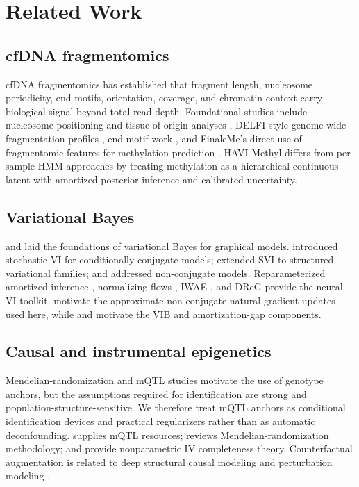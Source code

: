 \section{Related Work}
\label{sec:related}

\subsection{cfDNA fragmentomics}
cfDNA fragmentomics has established that fragment length, nucleosome periodicity, end motifs, orientation, coverage, and chromatin context carry biological signal beyond total read depth. Foundational studies include nucleosome-positioning and tissue-of-origin analyses \citep{snyder2016,sun2015,moss2018}, DELFI-style genome-wide fragmentation profiles \citep{cristiano2019delfi}, end-motif work \citep{zhou2022}, and FinaleMe's direct use of fragmentomic features for methylation prediction \citep{liu2024finaleme}. HAVI-Methyl differs from per-sample HMM approaches by treating methylation as a hierarchical continuous latent with amortized posterior inference and calibrated uncertainty.

\subsection{Variational Bayes}
\citet{mackay2003} and \citet{beal2003} laid the foundations of variational Bayes for graphical models. \citet{hoffman2013svi} introduced stochastic VI for conditionally conjugate models; \citet{hoffmanblei2015ssvi} extended SVI to structured variational families; and \citet{titsias2014doublystoch,kucukelbir2017advi} addressed non-conjugate models. Reparameterized amortized inference \citep{kingma2014vae,rezende2014}, normalizing flows \citep{rezende2015flows,kingma2016iaf,durkan2019nsf}, IWAE \citep{burda2016iwae}, and DReG \citep{tucker2019dreg} provide the neural VI toolkit. \citet{khan2017cvi,lin2019natgrad} motivate the approximate non-conjugate natural-gradient updates used here, while \citet{alemi2017vib} and \citet{cremer2018amortization} motivate the VIB and amortization-gap components.

\subsection{Causal and instrumental epigenetics}
Mendelian-randomization and mQTL studies motivate the use of genotype anchors, but the assumptions required for identification are strong and population-structure-sensitive. We therefore treat mQTL anchors as conditional identification devices and practical regularizers rather than as automatic deconfounding. \citet{min2021mqtl} supplies mQTL resources; \citet{sanderson2022mr} reviews Mendelian-randomization methodology; and \citet{newey2003instrumental,darolles2011nonparametric} provide nonparametric IV completeness theory. Counterfactual augmentation is related to deep structural causal modeling and perturbation modeling \citep{pawlowski2020dscm,kaddour2022causalml,lotfollahi2023cpa}.

